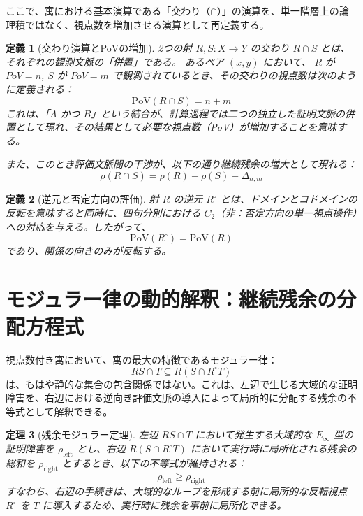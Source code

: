 \documentclass[11pt,a4paper]{article}
\newtheorem{definition}{定義}[section]
\newtheorem{theorem}[definition]{定理}
\begin{document}
ここで、寓における基本演算である「交わり（$\cap$）」の演算を、単一階層上の論理積ではなく、視点数を増加させる演算として再定義する。

\begin{definition}[交わり演算とPoVの増加]
2つの射 $R, S: X \to Y$ の交わり $R \cap S$ とは、それぞれの観測文脈の「併置」である。
あるペア $(x,y)$ において、
$R$ が $PoV = n$, $S$ が $PoV = m$ で観測されているとき、その交わりの視点数は次のように定義される：
\begin{equation}
    \text{PoV}(R \cap S) = n + m
\end{equation}
これは、「$A$ かつ $B$」という結合が、計算過程では二つの独立した証明文脈の併置として現れ、その結果として必要な視点数（PoV）が増加することを意味する。

また、このとき評価文脈間の干渉が、以下の通り継続残余の増大として現れる：
\begin{equation}
    \rho(R \cap S) = \rho(R) + \rho(S) + \Delta_{n,m}
\end{equation}
\end{definition}

\begin{definition}[逆元と否定方向の評価]
射 $R$ の逆元 $R^\circ$ とは、ドメインとコドメインの反転を意味すると同時に、四句分別における $C_2$（非：否定方向の単一視点操作）への対応を与える。したがって、
\begin{equation}
    \text{PoV}(R^\circ) = \text{PoV}(R)
\end{equation}
であり、関係の向きのみが反転する。

\end{definition}

\section{モジュラー律の動的解釈：継続残余の分配方程式}
視点数付き寓において、寓の最大の特徴であるモジュラー律：
\begin{equation}
    RS \cap T \subseteq R(S \cap R^\circ T)
\end{equation}
は、もはや静的な集合の包含関係ではない。これは、左辺で生じる大域的な証明障害を、右辺における逆向き評価文脈の導入によって局所的に分配する残余の不等式として解釈できる。

\begin{theorem}[残余モジュラー定理]
左辺 $RS \cap T$ において発生する大域的な $E_\infty$ 型の証明障害を $\rho_{\text{left}}$ とし、右辺 $R(S \cap R^\circ T)$ において実行時に局所化される残余の総和を $\rho_{\text{right}}$ とするとき、以下の不等式が維持される：
\begin{equation}
    \rho_{\text{left}} \ge \rho_{\text{right}}
\end{equation}
すなわち、右辺の手続きは、大域的なループを形成する前に局所的な反転視点 $R^\circ$ を $T$ に導入するため、実行時に残余を事前に局所化できる。
\end{theorem}
\end{document}
